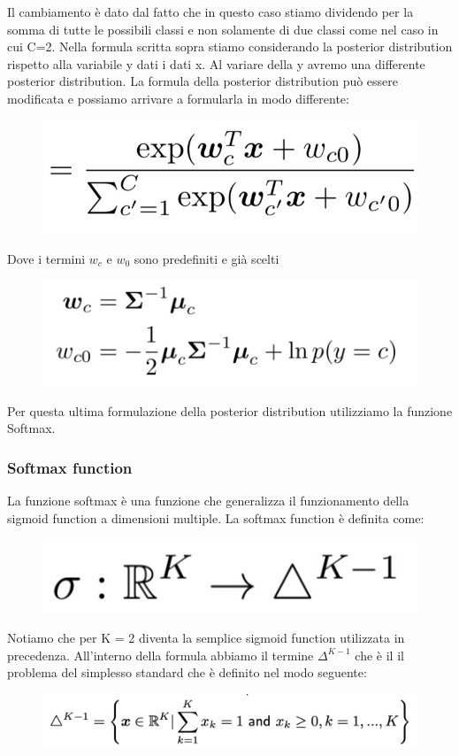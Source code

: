 \documentclass[14pt]{extreport}
\begin{document}
Il cambiamento è dato dal fatto che in questo caso stiamo dividendo per la somma di tutte le possibili classi e non solamente di due classi come nel
caso in cui C=2. Nella formula scritta sopra stiamo considerando la posterior distribution rispetto alla variabile y dati i dati x. Al variare della y
avremo una differente posterior distribution. La formula della posterior distribution può essere modificata e possiamo arrivare a formularla in modo
differente:

\begin{figure}[H]
	\centering
	\includegraphics[width=0.4\linewidth]{177.jpeg}
\end{figure}

Dove i termini $w_c$ e $w_0$ sono predefiniti e già scelti
\begin{figure}[H]
	\centering
	\includegraphics[width=0.4\linewidth]{178.jpeg}
\end{figure}

Per questa ultima formulazione della posterior distribution utilizziamo la funzione Softmax.

\subsubsection{Softmax function}

La funzione softmax è una funzione che generalizza il funzionamento della sigmoid function a dimensioni multiple. La softmax function è definita come:
\begin{figure}[H]
	\centering
	\includegraphics[width=0.4\linewidth]{179.jpeg}
\end{figure}

Notiamo che per K = 2 diventa la semplice sigmoid function utilizzata in precedenza. All'interno della formula abbiamo il termine $\Delta^{K-1}$ che è
il il problema del simplesso standard che è definito nel modo seguente:

\begin{figure}[H]
	\centering
	\includegraphics[width=0.5\linewidth]{180.jpeg}
\end{figure}
\end{document}

